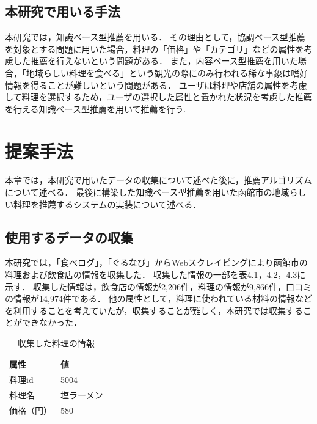 \documentclass{funthesis}
\begin{document}
\section{本研究で用いる手法}
本研究では，知識ベース型推薦を用いる．
その理由として，協調ベース型推薦を対象とする問題に用いた場合，料理の「価格」や「カテゴリ」などの属性を考慮した推薦を行えないという問題がある．
また，内容ベース型推薦を用いた場合，「地域らしい料理を食べる」という観光の際にのみ行われる稀な事象は嗜好情報を得ることが難しいという問題がある．
ユーザは料理や店舗の属性を考慮して料理を選択するため，ユーザの選択した属性と置かれた状況を考慮した推薦を行える知識ベース型推薦を用いて推薦を行う.

\chapter{提案手法}
本章では，本研究で用いたデータの収集について述べた後に，推薦アルゴリズムについて述べる．
最後に構築した知識ベース型推薦を用いた函館市の地域らしい料理を推薦するシステムの実装について述べる．


\section{使用するデータの収集}
本研究では，「食べログ」，「ぐるなび」からWebスクレイピングにより函館市の料理および飲食店の情報を収集した．
収集した情報の一部を表4.1，4.2，4.3に示す．
収集した情報は，飲食店の情報が2,206件，料理の情報が9,866件，口コミの情報が14,974件である．
他の属性として，料理に使われている材料の情報などを利用することを考えていたが，収集することが難しく，本研究では収集することができなかった．

\begin{table}[htb]
  \begin{center}
  \scriptsize
    \caption{収集した料理の情報}
    \normalsize
    \begin{tabular}{p{6cm}|p{6cm}}
    \hline
属性 & 値 \\ \hline\hline
      料理id & 5004 \\ \hline
      料理名 & 塩ラーメン \\ \hline
      価格（円） & 580 \\ \hline  \end{tabular}
  \end{center}
  \end{table}
  
\end{document}
